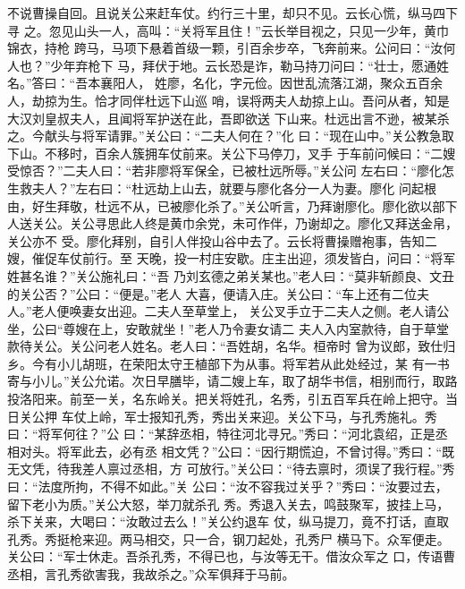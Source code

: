 不说曹操自回。且说关公来赶车仗。约行三十里，却只不见。云长心慌，纵马四下寻
之。忽见山头一人，高叫：“关将军且住！”云长举目视之，只见一少年，黄巾锦衣，持枪
跨马，马项下悬着首级一颗，引百余步卒，飞奔前来。公问曰：“汝何人也？”少年弃枪下
马，拜伏于地。云长恐是诈，勒马持刀问曰：“壮士，愿通姓名。”答曰：“吾本襄阳人，
姓廖，名化，字元俭。因世乱流落江湖，聚众五百余人，劫掠为生。恰才同伴杜远下山巡
哨，误将两夫人劫掠上山。吾问从者，知是大汉刘皇叔夫人，且闻将军护送在此，吾即欲送
下山来。杜远出言不逊，被某杀之。今献头与将军请罪。”关公曰：“二夫人何在？”化
曰：“现在山中。”关公教急取下山。不移时，百余人簇拥车仗前来。关公下马停刀，叉手
于车前问候曰：“二嫂受惊否？”二夫人曰：“若非廖将军保全，已被杜远所辱。”关公问
左右曰：“廖化怎生救夫人？”左右曰：“杜远劫上山去，就要与廖化各分一人为妻。廖化
问起根由，好生拜敬，杜远不从，已被廖化杀了。”关公听言，乃拜谢廖化。廖化欲以部下
人送关公。关公寻思此人终是黄巾余党，未可作伴，乃谢却之。廖化又拜送金帛，关公亦不
受。廖化拜别，自引人伴投山谷中去了。云长将曹操赠袍事，告知二嫂，催促车仗前行。至
天晚，投一村庄安歇。庄主出迎，须发皆白，问曰：“将军姓甚名谁？”关公施礼曰：“吾
乃刘玄德之弟关某也。”老人曰：“莫非斩颜良、文丑的关公否？”公曰：“便是。”老人
大喜，便请入庄。关公曰：“车上还有二位夫人。”老人便唤妻女出迎。二夫人至草堂上，
关公叉手立于二夫人之侧。老人请公坐，公曰“尊嫂在上，安敢就坐！”老人乃令妻女请二
夫人入内室款待，自于草堂款待关公。关公问老人姓名。老人曰：“吾姓胡，名华。桓帝时
曾为议郎，致仕归乡。今有小儿胡班，在荣阳太守王植部下为从事。将军若从此处经过，某
有一书寄与小儿。”关公允诺。次日早膳毕，请二嫂上车，取了胡华书信，相别而行，取路
投洛阳来。前至一关，名东岭关。把关将姓孔，名秀，引五百军兵在岭上把守。当日关公押
车仗上岭，军士报知孔秀，秀出关来迎。关公下马，与孔秀施礼。秀曰：“将军何往？”公
曰：“某辞丞相，特往河北寻兄。”秀曰：“河北袁绍，正是丞相对头。将军此去，必有丞
相文凭？”公曰：“因行期慌迫，不曾讨得。”秀曰：“既无文凭，待我差人禀过丞相，方
可放行。”关公曰：“待去禀时，须误了我行程。”秀曰：“法度所拘，不得不如此。”关
公曰：“汝不容我过关乎？”秀曰：“汝要过去，留下老小为质。”关公大怒，举刀就杀孔
秀。秀退入关去，鸣鼓聚军，披挂上马，杀下关来，大喝曰：“汝敢过去么！”关公约退车
仗，纵马提刀，竟不打话，直取孔秀。秀挺枪来迎。两马相交，只一合，钢刀起处，孔秀尸
横马下。众军便走。关公曰：“军士休走。吾杀孔秀，不得已也，与汝等无干。借汝众军之
口，传语曹丞相，言孔秀欲害我，我故杀之。”众军俱拜于马前。

